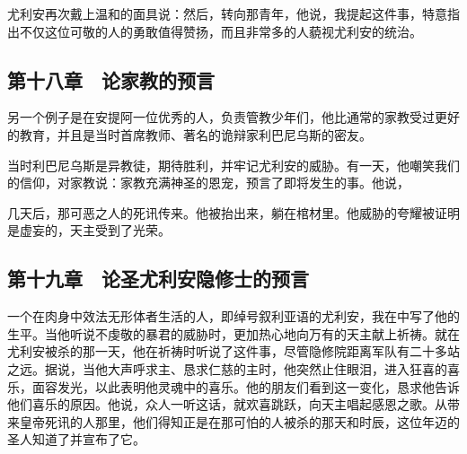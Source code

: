 尤利安再次戴上温和的面具说：然后，转向那青年，他说，我提起这件事，特意指出不仅这位可敬的人的勇敢值得赞扬，而且非常多的人藐视尤利安的统治。\par


\subsection{第十八章　论家教的预言}

另一个例子是在安提阿一位优秀的人，负责管教少年们，他比通常的家教受过更好的教育，并且是当时首席教师、著名的诡辩家利巴尼乌斯的密友。\par

当时利巴尼乌斯是异教徒，期待胜利，并牢记尤利安的威胁。有一天，他嘲笑我们的信仰，对家教说：家教充满神圣的恩宠，预言了即将发生的事。他说，\par

几天后，那可恶之人的死讯传来。他被抬出来，躺在棺材里。他威胁的夸耀被证明是虚妄的，天主受到了光荣。\par


\subsection{第十九章　论圣尤利安隐修士的预言}

一个在肉身中效法无形体者生活的人，即绰号叙利亚语的尤利安，我在中写了他的生平。当他听说不虔敬的暴君的威胁时，更加热心地向万有的天主献上祈祷。就在尤利安被杀的那一天，他在祈祷时听说了这件事，尽管隐修院距离军队有二十多站之远。据说，当他大声呼求主、恳求仁慈的主时，他突然止住眼泪，进入狂喜的喜乐，面容发光，以此表明他灵魂中的喜乐。他的朋友们看到这一变化，恳求他告诉他们喜乐的原因。他说，众人一听这话，就欢喜跳跃，向天主唱起感恩之歌。从带来皇帝死讯的人那里，他们得知正是在那可怕的人被杀的那天和时辰，这位年迈的圣人知道了并宣布了它。\par


